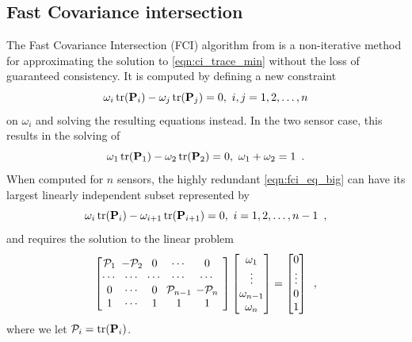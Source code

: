 \documentclass[letterpaper, 10 pt, journal, twoside]{ieeetran}  %
\begin{document}
\subsection{Fast Covariance intersection}
The Fast Covariance Intersection (FCI) algorithm from \cite{niehsenInformationFusionBased2002} is a non-iterative method for approximating the solution to \eqref{eqn:ci_trace_min} without the loss of guaranteed consistency. It is computed by defining a new constraint
\begin{equation}
   \omega_i \operatorname{tr}({{\mathbf{P}}}_i) - \omega_j \operatorname{tr}({{\mathbf{P}}}_j) = 0,\ i,j=1,2,\dots,n \label{eqn:fci_eq_big}
\end{equation}
on $\omega_i$ and solving the resulting equations instead. In the two sensor case, this results in the solving of
\begin{equation}
   \omega_1 \operatorname{tr}({{\mathbf{P}}}_1) - \omega_2 \operatorname{tr}({{\mathbf{P}}}_2) = 0,\ \omega_1 + \omega_2 = 1\enspace. \label{eqn:fci_2sen_omega_sum_eq}
\end{equation}
When computed for $n$ sensors, the highly redundant \eqref{eqn:fci_eq_big} can have its largest linearly independent subset represented by
\begin{equation}
   \omega_i \operatorname{tr}({{\mathbf{P}}}_i) - \omega_{i+1} \operatorname{tr}({{\mathbf{P}}}_{i+1}) = 0,\ i=1,2,\dots,n-1\enspace, \label{eqn:fci_eq}
\end{equation}
and requires the solution to the linear problem
\begin{equation}
   \begingroup
   \setlength\arraycolsep{2pt}
   \begin{bmatrix}
      \mathcal{P}_1 & -\mathcal{P}_2 & 0 & \cdots & 0 \\
      \cdots & \cdots & \cdots & \cdots & \cdots & \\
      0 & \cdots & 0 & \mathcal{P}_{n-1} & -\mathcal{P}_{n} \\
      1 & \cdots & 1 & 1 & 1 &
   \end{bmatrix}
   \begin{bmatrix}
      \omega_1 \\
      \vdots \\
      \omega_{n-1} \\
      \omega_{n}
   \end{bmatrix}
   =
   \begin{bmatrix}
      0 \\
      \vdots \\
      0 \\
      1
   \end{bmatrix}\enspace, \label{eqn:fci_eq_sys}
   \endgroup
\end{equation}
where we let $\mathcal{P}_i = \operatorname{tr}({{\mathbf{P}}}_i)$.
\end{document}
